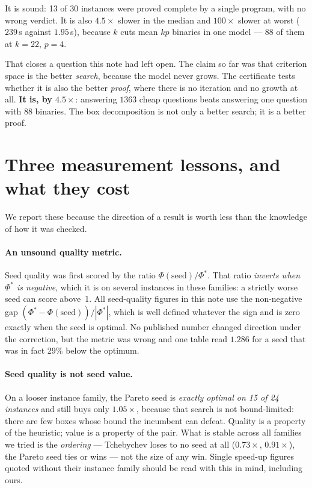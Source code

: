 \documentclass[11pt,a4paper]{article}
\begin{document}
It is sound: 13 of 30 instances were proved complete by a single program, with
no wrong verdict.  It is also $4.5\times$ slower in the median and
$100\times$ slower at worst ($239$\,s against $1.95$\,s), because $k$ cuts mean
$kp$ binaries in one model --- $88$ of them at $k = 22$, $p = 4$.

That closes a question this note had left open.  The claim so far was that
criterion space is the better \emph{search}, because the model never grows.
The certificate tests whether it is also the better \emph{proof}, where there
is no iteration and no growth at all.  \textbf{It is, by $4.5\times$}:
answering $1363$ cheap questions beats answering one question with $88$
binaries.  The box decomposition is not only a better search; it is a better
proof.

\section{Three measurement lessons, and what they cost}
\label{sec:lessons}

We report these because the direction of a result is worth less than the
knowledge of how it was checked.

\paragraph{An unsound quality metric.} Seed quality was first scored by the
ratio $\Phi(\text{seed}) / \Phi^{*}$. That ratio \emph{inverts when $\Phi^{*}$
is negative}, which it is on several instances in these families: a strictly
worse seed can score above~1. All seed-quality figures in this note use the
non-negative gap $(\Phi^{*} - \Phi(\text{seed}))/|\Phi^{*}|$, which is
well defined whatever the sign and is zero exactly when the seed is optimal.
No published number changed direction under the correction, but the metric was
wrong and one table read $1.286$ for a seed that was in fact 29\% below the
optimum.

\paragraph{Seed quality is not seed value.} On a looser instance family, the
Pareto seed is \emph{exactly optimal on 15 of 24 instances} and still buys only
$1.05\times$, because that search is not bound-limited: there are few boxes
whose bound the incumbent can defeat. Quality is a property of the heuristic;
value is a property of the pair. What is stable across all families we tried is
the \emph{ordering} --- Tchebychev loses to no seed at all ($0.73\times$,
$0.91\times$), the Pareto seed ties or wins --- not the size of any win. Single
speed-up figures quoted without their instance family should be read with this
in mind, including ours.
\end{document}
